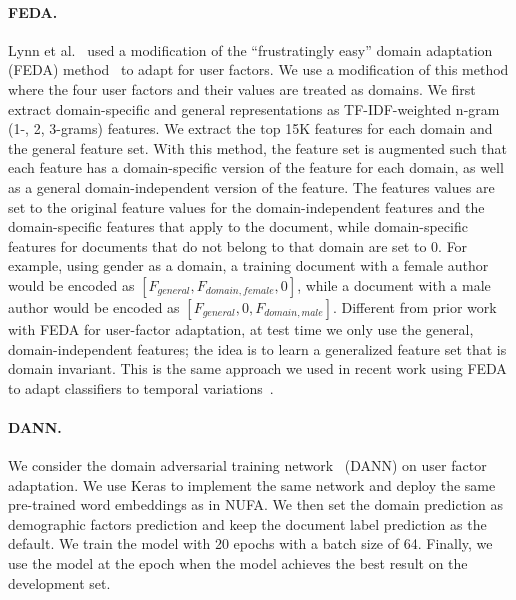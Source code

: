 \paragraph{FEDA.} 
Lynn et al.~\cite{lynn2017human} used a modification of the ``frustratingly easy'' domain adaptation (FEDA) method~\cite{daume2007frustratingly} to adapt for user factors. 
We use a modification of this method where the four user factors and their values are treated as domains.
We first extract domain-specific and general representations as TF-IDF-weighted n-gram (1-, 2, 3-grams) features. We extract the top 15K features for each domain and the general feature set.
With this method, the feature set is augmented such that each feature has a domain-specific version of the feature for each domain, as well as a general domain-independent version of the feature.
The features values are set to the original feature values for the domain-independent features and the domain-specific features that apply to the document, while domain-specific features for documents that do not belong to that domain are set to $0$.
For example, using gender as a domain, a training document with a female author would be encoded as $[F_{general}, F_{domain, female}, 0]$, while a document with a male author would be encoded as $[F_{general}, 0, F_{domain, male}]$.
Different from prior work with FEDA for user-factor adaptation, 
at test time we only use the general, domain-independent features;
the idea is to learn a generalized feature set that is domain invariant.
This is the same approach we used in recent work using FEDA to adapt classifiers to temporal variations~\cite{huang2018examining}.


\paragraph{DANN.} We consider the domain adversarial training network~\cite{ganin2016domain} (DANN) on user factor adaptation. We use Keras to implement the same network and deploy the same pre-trained word embeddings as in NUFA. We then set the domain prediction as demographic factors prediction and keep the document label prediction as the default. We train the model with 20 epochs with a batch size of 64. Finally, we use the model at the epoch when the model achieves the best result on the development set.


